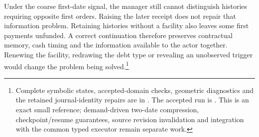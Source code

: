 Under the coarse first-date signal, the manager still cannot distinguish histories requiring opposite first orders. Raising the later receipt does not repair that information problem. Retaining histories without a facility also leaves some first payments unfunded. A correct continuation therefore preserves contractual memory, cash timing and the information available to the actor together. Renewing the facility, redrawing the debt type or revealing an unobserved trigger would change the problem being solved.\footnote{Complete symbolic states, accepted-domain checks, geometric diagnostics and the retained journal-identity repairs are in . The accepted run is . This is an exact small reference; demand-driven two-date compression, checkpoint/resume guarantees, source revision invalidation and integration with the common typed executor remain separate work.}
